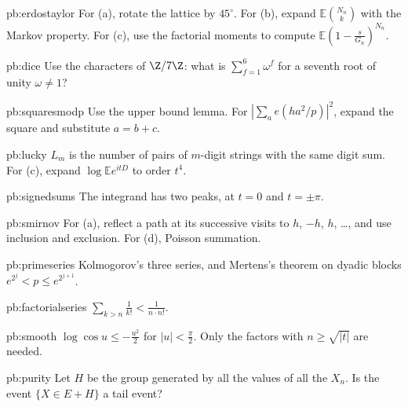 \begin{hint}{pb:erdostaylor}
For (a), rotate the lattice by $45^\circ$. For (b), expand $\mathbb E\binom{N_n}k$ with the Markov property. For (c), use the factorial moments to compute
$\mathbb E(1-\frac s{G_n})^{N_n}$.
\end{hint}

\begin{hint}{pb:dice}
Use the characters of $\Z/7\Z$: what is $\sum_{f=1}^6\omega^{f}$ for a seventh root of unity $\omega\ne1$?
\end{hint}

\begin{hint}{pb:squaresmodp}
Use the upper bound lemma. For $|\sum_a e(ha^2/p)|^2$, expand the square and substitute $a=b+c$.
\end{hint}

\begin{hint}{pb:lucky}
$L_m$ is the number of pairs of $m$-digit strings with the same digit sum. For (c), expand $\log\mathbb Ee^{itD}$ to order $t^4$.
\end{hint}

\begin{hint}{pb:signedsums}
The integrand has two peaks, at $t=0$ and $t=\pm\pi$.
\end{hint}

\begin{hint}{pb:smirnov}
For (a), reflect a path at its successive visits to $h$, $-h$, $h$, \dots, and use inclusion and exclusion. For (d), Poisson summation.
\end{hint}

\begin{hint}{pb:primeseries}
Kolmogorov's three series, and Mertens's theorem on dyadic blocks $e^{2^j}<p\le e^{2^{j+1}}$.
\end{hint}

\begin{hint}{pb:factorialseries}
$\sum_{k>n}\frac1{k!}<\frac1{n\cdot n!}$.
\end{hint}

\begin{hint}{pb:smooth}
$\log\cos u\le-\frac{u^2}2$ for $|u|<\frac\pi2$. Only the factors with $n\ge\sqrt{|t|}$ are needed.
\end{hint}

\begin{hint}{pb:purity}
Let $H$ be the group generated by all the values of all the $X_n$. Is the event $\{X\in E+H\}$ a tail event?
\end{hint}

